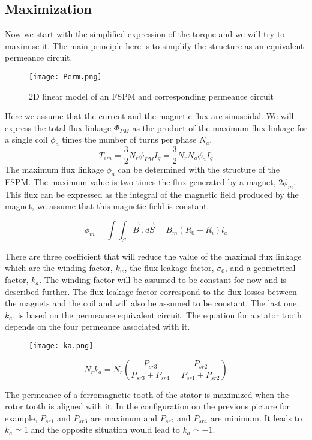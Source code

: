 \subsection{Maximization}

Now we start with the simplified expression of the torque and we will try to maximise it. The main principle here is to simplify the structure as an equivalent permeance circuit. 

\begin{figure}[H]
    \centering
    \texttt{[image: Perm.png]}
    \caption{2D linear model of an FSPM and corresponding permeance circuit}
\end{figure}
 Here we assume that the current and the magnetic flux are sinusoidal. We will express the total flux linkage $\Phi_{PM}$ as the product of the maximum flux linkage for a single coil $\phi_{a}$ times the number of turns per phase $N_{a}$.
 $$ T_{em} = \frac{3}{2}N_{r}\psi_{PM}I_{q} = \frac{3}{2}N_{r}N_{a}\phi_{a}I_{q}$$
 The maximum flux linkage $\phi_{a}$ can be determined with the structure of the FSPM. The maximum value is two times the flux generated by a magnet, $2\phi_{m}$. This flux can be expressed as the integral of the magnetic field produced by the magnet, we assume that this magnetic field is constant.
 
 $$ \phi_{m} = \int \int_{S} \overrightarrow{B} ~.~ \overrightarrow{dS} = B_{m}(R_{0}-R_{i})l_{a} $$
 
 There are three coefficient that will reduce the value of the maximal flux linkage which are the winding factor, $k_{w}$, the flux leakage factor, $\sigma_{0}$, and a geometrical factor, $k_{a}$. The winding factor will be assumed to be constant for now and is described further. The flux leakage factor correspond to the flux losses between the magnets and the coil and will also be assumed to be constant. The last one, $k_{a}$, is based on the permeance equivalent circuit. The equation for a stator tooth depends on the four permeance associated with it. 
 
 \begin{figure}[H]
    \centering
    \texttt{[image: ka.png]}
    \caption{}
\end{figure}
 
 $$ N_{r}k_{a} = N_{r}(\frac{P_{sr3}}{P_{sr3}+P_{sr4}}-\frac{P_{sr2}}{P_{sr1}+P_{sr2}}) $$
 
 The permeance of a ferromagnetic tooth of the stator is maximized when the rotor tooth is aligned with it. In the configuration on the previous picture for example, $P_{sr1}$ and $P_{sr3}$ are maximum and $P_{sr2}$ and $P_{sr4}$ are minimum. It leads to $k_{a} \simeq 1$ and the opposite situation would lead to $k_{a} \simeq -1$.
 
